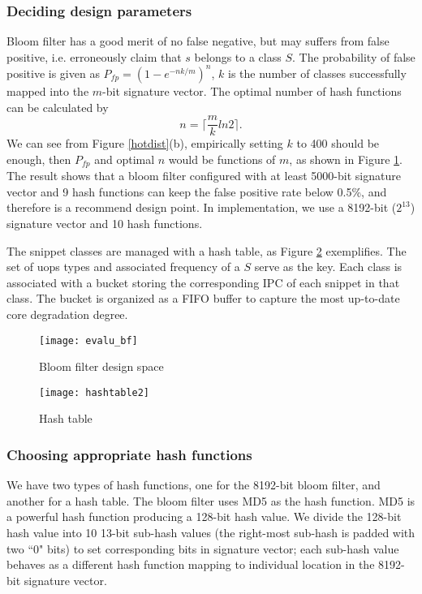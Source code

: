\subsubsection{Deciding design parameters}
Bloom filter \cite{bloomfilter} has a good merit of no false negative, but may suffers from false positive, i.e. erroneously claim that $s$ belongs to a class $S$.  The probability of false positive  is given as  $P_{fp}=(1-e^{-nk/m})^n$, $k$ is the number of classes successfully mapped into the $m$-bit signature vector.  The optimal number of hash functions can be calculated by
\begin{equation}
  n=\lceil \frac{m}{k}ln2\rceil.
\end{equation}
We can see from Figure \ref{hotdist}(b),  empirically setting $k$ to 400 should be enough, then $P_{fp}$ and optimal $n$ would be functions of $m$, as shown in Figure \ref{evalubf}. The result shows that a bloom filter configured with at least 5000-bit signature vector and 9 hash functions can keep the false positive rate below 0.5\%, and therefore is a recommend design point.  In implementation, we use a 8192-bit ($2^{13}$) signature vector and 10 hash functions.

The snippet classes are managed with a hash table, as Figure \ref{hashtable} exemplifies. The set of uops types and associated frequency of a $S$ serve as the key. Each class is associated with a bucket storing the corresponding IPC of each snippet in that class.  The bucket is organized as a FIFO buffer to capture the most up-to-date core degradation degree.

\begin{figure}[t]
  \centering
  \texttt{[image: evalu\_bf]}\\
  \caption{Bloom filter design space}\label{evalubf}

\end{figure}

\begin{figure}[t]
  \centering
  \texttt{[image: hashtable2]}\\
  \caption{Hash table}\label{hashtable}
\end{figure}

\subsubsection{Choosing appropriate hash functions}
We have two types of hash functions, one for the 8192-bit bloom filter, and another for a hash table. The bloom filter uses MD5 \cite{md5} as the hash function. MD5 is a powerful hash function producing a 128-bit hash value. We divide the 128-bit hash value into 10 13-bit sub-hash values (the right-most sub-hash is padded with two ``0" bits)   to set corresponding bits in signature vector; each sub-hash value behaves as a different hash function mapping to individual location in the 8192-bit signature vector.

